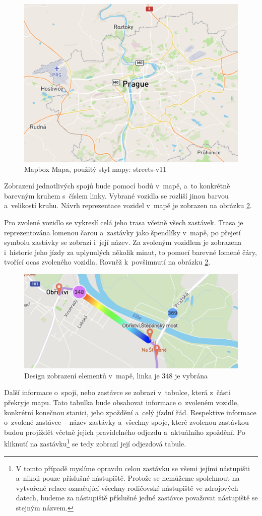 \begin{figure}
\centering
  \includegraphics[width=0.5\linewidth]{../img/mapa_mapbox.png}
  \caption{Mapbox Mapa, použitý styl mapy: streets-v11}
  \label{fig:mapbox_mapa}
\end{figure}

\bigbreak


Zobrazení jednotlivých spojů bude pomocí bodů v~mapě, a~to konkrétně barevným kruhem s~číslem linky. Vybrané vozidla se rozliší jinou barvou a~velikostí kruhu. Návrh reprezentace vozidel v~mapě je zobrazen na obrázku \ref{fig:dve_vozidla}.


\bigbreak


Pro zvolené vozidlo se vykreslí celá jeho trasa včetně všech zastávek. Trasa je reprezentována lomenou čarou a~zastávky jako špendlíky v~mapě, po přejetí symbolu zastávky se zobrazí i~její název. Za zvoleným vozidlem je zobrazena i~historie jeho jízdy za uplynulých několik minut, to pomocí barevné lomené čáry, tvořící ocas zvoleného vozidla. Rovněž k~povšimnutí na obrázku \ref{fig:dve_vozidla}.


\begin{figure}
\centering
  \includegraphics[width=0.5\linewidth]{../img/dve_vozidla.png}
  \caption{Design zobrazení elementů v~mapě, linka je 348 je vybrána}
  \label{fig:dve_vozidla}
\end{figure}

\bigbreak

Další informace o~spoji, nebo zastávce se zobrazí v~tabulce, která z~části překryje mapu. Tato tabulka bude obsahovat informace o~zvoleném vozidle, konkrétní konečnou stanici, jeho zpoždění a~celý jízdní řád. Respektive informace o~zvolené zastávce – název zastávky a~všechny spoje, které zvolenou zastávkou budou projíždět včetně jejich pravidelného odjezdu a~aktuálního zpoždění. Po kliknutí na zastávku\footnote{V tomto případě myslíme opravdu celou zastávku se všemi jejími nástupišti a~nikoli pouze příslušné nástupiště. Protože se nemůžeme spolehnout na vytvořené relace označující všechny rodičovské nástupiště ve zdrojových datech, budeme za nástupiště příslušné jedné zastávce považovat nástupiště se stejným názvem.} se tedy zobrazí její odjezdová tabule.
